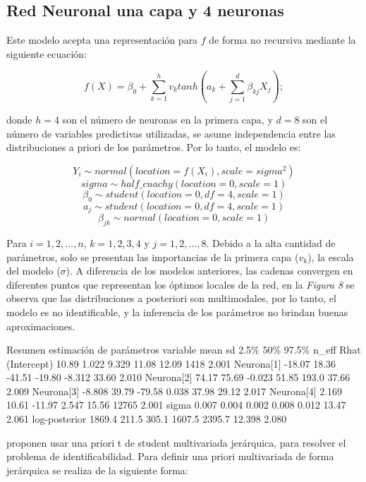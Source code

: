 \documentclass[nojss]{jss}
\begin{document}
\subsection{Red Neuronal una capa y 4 neuronas}

Este modelo acepta una representación para $f$ de forma no recursiva mediante la siguiente ecuación:

$$f(X) = \beta_0 + \sum_{k=1}^h v_k tanh\left(a_k + \sum_{j=1}^d \beta_{kj}X_j \right);$$

donde $h=4$ son el número de neuronas en la primera capa, y $d = 8$ son el número de variables predictivas utilizadas, se asume independencia entre las distribuciones a priori de los parámetros. Por lo tanto, el modelo es:

$$Y_i \sim normal(location = f(X_i),scale = sigma^2)$$
$$sigma \sim half\_cuachy(location = 0,scale = 1)$$
$$\beta_0 \sim student(location = 0,df= 4,scale = 1)$$
$$a_j \sim student(location = 0,df=4,scale = 1)$$
$$\beta_{jk} \sim normal(location = 0,scale = 1)$$

Para $i = 1,2,\ldots,n$, $k = 1,2,3,4$ y $j = 1,2,\ldots,8$. Debido a la alta cantidad de parámetros, solo se presentan las importancias de la primera capa ($v_k$), la escala del modelo ($\sigma$). A diferencia de los modelos anteriores, las cadenas convergen en diferentes puntos que representan los óptimos locales de la red, en la \textit{Figura 8} se observa que las distribuciones a posteriori son multimodales, por lo tanto, el modelo es no identificable, y la inferencia de los parámetros no brindan buenas aproximaciones. 

\begin{CodeChunk}	
\begin{CodeOutput}
 		Resumen estimación de parámetros
  variable       mean   sd    2.5\%   50\%  97.5\% n_eff    Rhat
 (Intercept)    10.89  1.022  9.329  11.08  12.09  1418    2.001  
 Neurona[1]    -18.07  18.36 -41.51 -19.80 -8.312  33.60   2.010
 Neurona[2]     74.17  75.69 -0.023  51.85  193.0  37.66   2.009
 Neurona[3]    -8.808  39.79 -79.58  0.038  37.98  29.12   2.017  
 Neurona[4]     2.169  10.61 -11.97  2.547  15.56  12765   2.001 
 sigma          0.007  0.004  0.002  0.008  0.012  13.47   2.061 
 log-posterior 1869.4  211.5  305.1 1607.5 2395.7  12.398  2.080  
\end{CodeOutput}  
\end{CodeChunk}


\cite{Paige2001} proponen usar una priori t de student multivariada jerárquica, para resolver el problema de identificabilidad. Para definir una priori multivariada de forma jerárquica se realiza de la siguiente forma:
\end{document}
